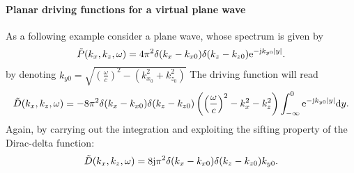 \paragraph{Planar driving functions for a virtual plane wave \\} 
As a following example consider a plane wave, whose spectrum is given by
\begin{equation}
\tilde{P}(k_x,k_z,\omega) = 4\pi^2 \delta(k_x- k_{x0}) \delta( k_z - k_{z0}) \mathrm{e}^{-\mathrm{j} k_{y0} |y|}.
\end{equation}
by denoting $k_{y0} =\sqrt{\left( \frac{\omega}{c}  \right)^2 - \left( k_{x_0}^2 + k_{z_0}^2 \right) } $ The driving function will read
\begin{equation}
\tilde{D}(k_x,k_z,\omega)
= - 8 \pi^2 \delta(k_x- k_{x0}) \delta( k_z - k_{z0}) \left( \left( \frac{\omega}{c}  \right)^2 - k_x^2 - k_z^2   \right) \int_{-\infty}^{0} \mathrm{e}^{-\mathrm{j} k_{y0} |y|} \mathrm{d} y .
\end{equation}
Again, by carrying out the integration and exploiting the sifting property of the Dirac-delta function:
\begin{equation}
\tilde{D}(k_x,k_z,\omega)
= 8 \mathrm{j} \pi^2 \delta(k_x- k_{x0}) \delta( k_z - k_{z0}) k_{y0} .
\end{equation}
